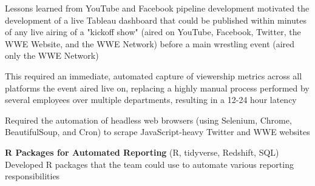 \begin{itemize*}
    \begin{itemize*}
      \item Lessons learned from YouTube and Facebook pipeline
        development motivated the development of a live Tableau
        dashboard that could be published within minutes of any live
        airing of a "kickoff show" (aired on YouTube, Facebook, Twitter,
        the WWE Website, and the WWE Network) before a main wrestling event (aired
        only the WWE Network) 
      \item This required an immediate, automated capture of viewership metrics across 
        all platforms the event aired live on, replacing a highly manual
        process performed by several employees over multiple
        departments, resulting in a 12-24 hour latency
      \item Required the automation of headless web browsers (using Selenium, Chrome,
         BeautifulSoup, and Cron) to scrape JavaScript-heavy Twitter and WWE
         websites 
    \end{itemize*}
  \item\leftandright
    {\textbf{R Packages for Automated Reporting}}
    {\small{(R, tidyverse, Redshift, SQL)}} \\
    Developed R packages that the team could use to automate
    various reporting responsibilities
\end{itemize*}

